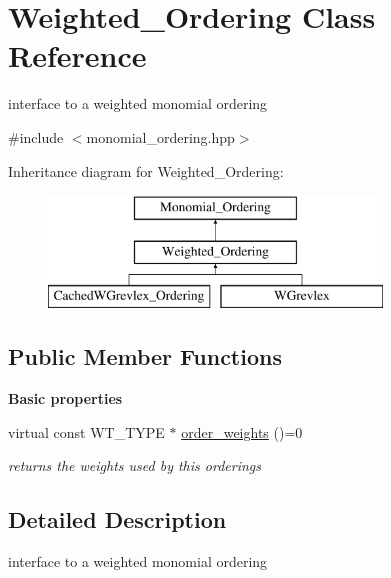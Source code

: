 \hypertarget{class_weighted___ordering}{}\section{Weighted\+\_\+\+Ordering Class Reference}
\label{class_weighted___ordering}


interface to a weighted monomial ordering  




{\ttfamily \#include $<$monomial\+\_\+ordering.\+hpp$>$}

Inheritance diagram for Weighted\+\_\+\+Ordering\+:\begin{figure}[H]
\begin{center}
\leavevmode
\includegraphics[height=3.000000cm]{class_weighted___ordering}
\end{center}
\end{figure}
\subsection*{Public Member Functions}
\begin{Indent}\textbf{ Basic properties}\par
\begin{DoxyCompactItemize}
\item 
\mbox{\label{class_weighted___ordering_ae1903d7337777e09acc220987c53ecdc}} 
virtual const W\+T\+\_\+\+T\+Y\+PE $\ast$ \hyperlink{class_weighted___ordering_ae1903d7337777e09acc220987c53ecdc}{order\+\_\+weights} ()=0
\begin{DoxyCompactList}\small\item\em returns the weights used by this orderings \end{DoxyCompactList}\end{DoxyCompactItemize}
\end{Indent}


\subsection{Detailed Description}
interface to a weighted monomial ordering 

